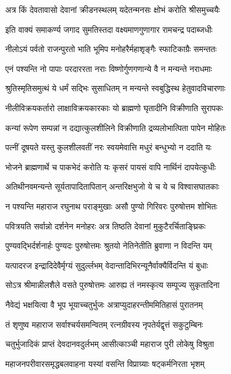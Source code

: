 \twolineshloka
{अत्र किं देवतावासो देवानां क्रीडनस्थलम्}
{यदेतन्मनसः क्षोभं करोति श्रीसमुच्चयैः}%

\twolineshloka
{इति वाक्यं समाकर्ण्य जगाद सुमतिस्तदा}
{वक्ष्यमाणगुणागार रामचन्द्र पदाब्जधीः}%

\twolineshloka
{नीलोऽयं पर्वतो राजन्पुरतो भाति भूमिप}
{मनोहरैर्महाशृङ्गैः स्फाटिकाग्रैः समन्ततः}%

\twolineshloka
{एनं पश्यन्ति नो पापाः परदाररता नराः}
{विष्णोर्गुणगणान्ये वै न मन्यन्ते नराधमाः}%

\twolineshloka
{श्रुतिस्मृतिसमुत्थं ये धर्मं सद्भिः सुसाधितम्}
{न मन्यन्ते स्वबुद्धिस्थ हेतुवादविचारणाः}%

\twolineshloka
{नीलीविक्रयकर्तारो लाक्षाविक्रयकारकाः}
{यो ब्राह्मणो घृतादीनि विक्रीणाति सुरापकः}%

\twolineshloka
{कन्यां रूपेण सम्पन्नां न दद्यात्कुलशीलिने}
{विक्रीणाति द्रव्यलोभात्पिता पापेन मोहितः}%

\twolineshloka
{पत्नीं दूषयते यस्तु कुलशीलवतीं नरः}
{स्वयमेवात्ति मधुरं बन्धुभ्यो न ददाति यः}%

\twolineshloka
{भोजने ब्राह्मणार्थे च पाकभेदं करोति यः}
{कृसरं पायसं वापि नार्थिनं दापयेत्कुधीः}%

\twolineshloka
{अतिथीनवमन्यन्ते सूर्यतापादितापितान्}
{अन्तरिक्षभुजो ये च ये च विश्वासघातकाः}%

\twolineshloka
{न पश्यन्ति महाराज रघुनाथ पराङ्मुखाः}
{असौ पुण्यो गिरिवरः पुरुषोत्तम शोभितः}%

\twolineshloka
{पवित्रयति सर्वान्नो दर्शनेन मनोहरः}
{अत्र तिष्ठति देवानां मुकुटैरर्चिताङ्घ्रिकः}%

\twolineshloka
{पुण्यवद्भिर्दर्शनार्हः पुण्यदः पुरुषोत्तमः}
{श्रुतयो नेतिनेतीति ब्रुवाणा न विदन्ति यम्}%

\twolineshloka
{यत्पादरज इन्द्रादिदेवैर्मृग्यं सुदुर्ल्लभम्}
{वेदान्तादिभिरन्यूनैर्वाक्यैर्विदन्ति यं बुधाः}%

\twolineshloka
{सोऽत्र श्रीमान्नीलशैले वसते पुरुषोत्तमः}
{आरुह्य तं नमस्कृत्य सम्पूज्य सुकृतादिना}%

\twolineshloka
{नैवेद्यं भक्षयित्वा वै भूप भूयाच्चतुर्भुजः}
{अत्राप्युदाहरन्तीममितिहासं पुरातनम्}%

\twolineshloka
{तं शृणुष्व महाराज सर्वाश्चर्यसमन्वितम्}
{रत्नग्रीवस्य नृपतेर्यद्वृत्तं सकुटुम्बिनः}%

\twolineshloka
{चतुर्भुजादिकं प्राप्तं देवदानवदुर्लभम्}
{आसीत्काञ्ची महाराज पुरी लोकेषु विश्रुता}%

\twolineshloka
{महाजनपरीवारसमृद्धबलवाहना}
{यस्यां वसन्ति विप्राग्र्याः षट्कर्मनिरता भृशम्}%

